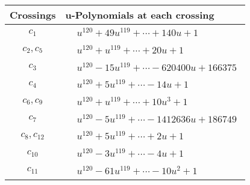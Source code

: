 \documentclass[1p]{elsarticle_modified}
\theoremstyle{definition}
\begin{document}
\begin{tabular}{m{50pt}|m{274pt}}
Crossings & \hspace{64pt}u-Polynomials at each crossing \\
\hline $$\begin{aligned}c_{1}\end{aligned}$$&$\begin{aligned}
&u^{120}+49 u^{119}+\cdots+140 u+1
\end{aligned}$\\
\hline $$\begin{aligned}c_{2},c_{5}\end{aligned}$$&$\begin{aligned}
&u^{120}+u^{119}+\cdots+20 u+1
\end{aligned}$\\
\hline $$\begin{aligned}c_{3}\end{aligned}$$&$\begin{aligned}
&u^{120}-15 u^{119}+\cdots-620400 u+166375
\end{aligned}$\\
\hline $$\begin{aligned}c_{4}\end{aligned}$$&$\begin{aligned}
&u^{120}+5 u^{119}+\cdots-14 u+1
\end{aligned}$\\
\hline $$\begin{aligned}c_{6},c_{9}\end{aligned}$$&$\begin{aligned}
&u^{120}+u^{119}+\cdots+10 u^3+1
\end{aligned}$\\
\hline $$\begin{aligned}c_{7}\end{aligned}$$&$\begin{aligned}
&u^{120}-5 u^{119}+\cdots-1412636 u+186749
\end{aligned}$\\
\hline $$\begin{aligned}c_{8},c_{12}\end{aligned}$$&$\begin{aligned}
&u^{120}+5 u^{119}+\cdots+2 u+1
\end{aligned}$\\
\hline $$\begin{aligned}c_{10}\end{aligned}$$&$\begin{aligned}
&u^{120}-3 u^{119}+\cdots-4 u+1
\end{aligned}$\\
\hline $$\begin{aligned}c_{11}\end{aligned}$$&$\begin{aligned}
&u^{120}-61 u^{119}+\cdots-10 u^2+1
\end{aligned}$\\
\hline
\end{tabular}\\~\\
\end{document}
